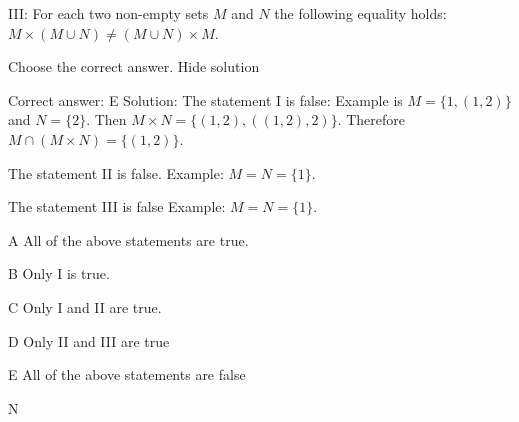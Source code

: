 III: For each two non-empty sets \( M \) and \( N \) the following equality holds: \( M\times (M\cup N)\neq (M\cup N)\times M \).

Choose the correct answer.
Hide solution

Correct answer: E
Solution: The statement I is false: Example is \( M=\{1,(1,2)\} \) and \( N=\{2\} \). Then \( M\times N=\{(1,2),((1,2),2)\} \). Therefore \( M\cap (M\times N)=\{(1,2)\} \).

The statement II is false. Example: \( M=N=\{1\} \).

The statement III is false Example: \( M=N=\{1\} \).

   A    All of the above statements are true.

   B    Only I is true.

   C    Only I and II are true.

   D    Only II and III are true

   E    All of the above statements are false

   N    